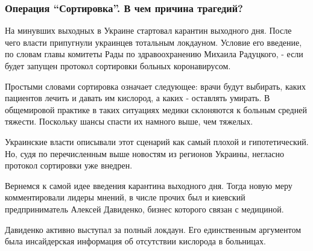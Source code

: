  
 
 
 
 
\subsubsection{Операция \enquote{Сортировка}. В чем причина трагедий?}

На минувших выходных в Украине стартовал карантин выходного дня. После чего
власти припугнули украинцев тотальным локдауном. Условие его введение, по
словам главы комитеты Рады по здравоохранению Михаила Радуцкого, - если будет
запущен протокол сортировки больных коронавирусом. 

Простыми словами сортировка означает следующее: врачи будут выбирать, каких
пациентов лечить и давать им кислород, а каких - оставлять умирать. В
общемировой практике в таких ситуациях медики склоняются к больным средней
тяжести. Поскольку шансы спасти их намного выше, чем тяжелых. 

Украинские власти описывали этот сценарий как самый плохой и гипотетический.
Но, судя по перечисленным выше новостям из регионов Украины, негласно протокол
сортировки уже внедрен. 

Вернемся к самой идее введения карантина выходного дня. Тогда новую меру
комментировали лидеры мнений, в числе прочих был и киевский предприниматель
Алексей Давиденко, бизнес которого связан с медициной. 

Давиденко активно выступал за полный локдаун. Его единственным аргументом была
инсайдерская информация об отсутствии кислорода в больницах.

